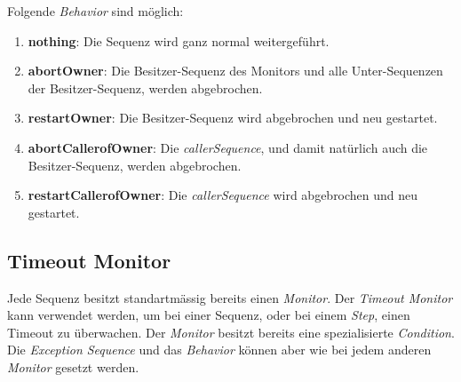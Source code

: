 Folgende \textit{Behavior} sind möglich:
\begin{enumerate}
\item \textbf{nothing}: Die Sequenz wird ganz normal weitergeführt.
\item \textbf{abortOwner}: Die Besitzer-Sequenz des Monitors und alle Unter-Sequenzen der Besitzer-Sequenz, werden abgebrochen.
\item \textbf{restartOwner}: Die Besitzer-Sequenz wird abgebrochen und neu gestartet.
\item \textbf{abortCallerofOwner}: Die \textit{callerSequence}, und damit natürlich auch die Besitzer-Sequenz, werden abgebrochen.
\item \textbf{restartCallerofOwner}: Die \textit{callerSequence} wird abgebrochen und neu gestartet.
\end{enumerate}



\subsection{Timeout Monitor}
\label{monitorTimeout}
Jede Sequenz besitzt standartmässig bereits einen \textit{Monitor}.
Der \textit{Timeout Monitor} kann verwendet werden, um bei einer Sequenz, oder bei einem \textit{Step}, einen Timeout zu überwachen.
Der \textit{Monitor} besitzt bereits eine spezialisierte \textit{Condition}.
Die \textit{Exception Sequence} und das \textit{Behavior} können aber wie bei jedem anderen \textit{Monitor} gesetzt werden.





